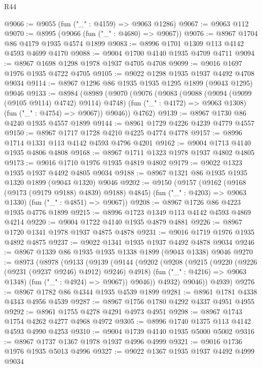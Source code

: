 \begin{lexlean}{R44}
\begin{coremodule}
@9066 := @9055 (fun ("_" : @4159) => @9063 @1286)
@9067 := @9063 @112
@9070 := @8995 (@9066 (fun ("_" : @4680) => @9067))
@9076 := @8967 @1704 @86 @4179 @1935 @4574 @1899
@9083 := @8996 @1701 @1309 @113 @4142 @4593 @4699 @4170
@9088 := @9004 @1700 @4140 @1935 @4709 @4711
@9094 := @8967 @1698 @1298 @1978 @1937 @4705 @4708
@9099 := @9016 @1697 @1976 @1935 @4722 @4705
@9105 := @9022 @1298 @1935 @1937 @4492 @4708 @9034
@9114 := @8967 @1296 @86 @1935 @1935 @1295 @1899 (@9043 @1295) @9046
@9133 := @8984
    (@8989
      (@9070
        (@9076
          (@9083
            (@9088 (@9094 (@9099 (@9105 @9114) @4742) @9114) @4748)
            (fun ("_" : @4172) => @9063 @1308)
            (fun ("_" : @4754) => @9067))
          @9046))
      @4762)
@9139 := @8967 @1730 @86 @4240 @1935 @4557 @1899
@9144 := @8961 @1729 @4226 @4239 @4779 @4557
@9150 := @8967 @1717 @1728 @4210 @4225 @4774 @4778
@9157 := @8996 @1714 @1331 @113 @4142 @4593 @4796 @4201
@9162 := @9004 @1713 @4140 @1935 @4806 @4808
@9168 := @8967 @1711 @1323 @1978 @1937 @4802 @4805
@9173 := @9016 @1710 @1976 @1935 @4819 @4802
@9179 := @9022 @1323 @1935 @1937 @4492 @4805 @9034
@9188 := @8967 @1321 @86 @1935 @1935 @1320 @1899 (@9043 @1320) @9046
@9202 := @9150
    (@9157
      (@9162 (@9168 (@9173 (@9179 @9188) @4839) @9188) @4845)
      (fun ("_" : @4203) => @9063 @1330)
      (fun ("_" : @4851) => @9067))
@9208 := @8967 @1726 @86 @4223 @1935 @4776 @1899
@9215 := @8996 @1723 @1349 @113 @4142 @4593 @4869 @4214
@9220 := @9004 @1722 @4140 @1935 @4879 @4881
@9226 := @8967 @1720 @1341 @1978 @1937 @4875 @4878
@9231 := @9016 @1719 @1976 @1935 @4892 @4875
@9237 := @9022 @1341 @1935 @1937 @4492 @4878 @9034
@9246 := @8967 @1339 @86 @1935 @1935 @1338 @1899 (@9043 @1338) @9046
@9270 := @8973
    (@8978
      (@9133
        (@9139
          (@9144
            (@9202
              (@9208
                (@9215
                  (@9220 (@9226 (@9231 (@9237 @9246) @4912) @9246) @4918)
                  (fun ("_" : @4216) => @9063 @1348)
                  (fun ("_" : @4924) => @9067))
                @9046))
            @4932)
          @9046))
      @4939)
@9276 := @8967 @1782 @86 @4344 @1935 @4539 @1899
@9281 := @8961 @1781 @4338 @4343 @4956 @4539
@9287 := @8967 @1756 @1780 @4292 @4337 @4951 @4955
@9292 := @8961 @1755 @4278 @4291 @4973 @4951
@9298 := @8967 @1743 @1754 @4262 @4277 @4968 @4972
@9305 := @8996 @1740 @1375 @113 @4142 @4593 @4990 @4253
@9310 := @9004 @1739 @4140 @1935 @5000 @5002
@9316 := @8967 @1737 @1367 @1978 @1937 @4996 @4999
@9321 := @9016 @1736 @1976 @1935 @5013 @4996
@9327 := @9022 @1367 @1935 @1937 @4492 @4999 @9034

\end{coremodule}
\end{lexlean}
